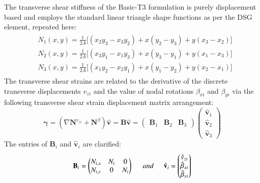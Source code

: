The transverse shear stiffness of the Basic-T3 formulation is purely displacement based and employs the standard linear triangle shape functions as per the DSG element, repeated here:
\begin{gather} 
\begin{aligned}
&N_1 (x , y) = \frac{1}{2 A} \big[ (x_2 y_3 - x_3 y_2) + x(y_2 - y_3) + y(x_3 - x_2) \big]
\\
&N_2 (x , y) = \frac{1}{2 A} \big[ (x_3 y_1 - x_1 y_3) + x(y_3 - y_1) + y(x_1 - x_3) \big]
\\
&N_3 (x , y) = \frac{1}{2 A} \big[ (x_1 y_2 - x_2 y_1) + x(y_1 - y_2) + y(x_2 - x_1) \big]
\label{eqApp2_1}
\end{aligned}
\end{gather}
The transverse shear strains are related to the derivative of the discrete transverse displacements $v_{zi}$ and the value of nodal rotations $\beta_{xi}$ and $\beta_{yi}$ via the following transverse shear strain displacement matrix arrangement:
\begin{equation}
\boldsymbol{\gamma} = (\nabla \mathbf{N}^{v_{zi}} + \mathbf{N}^{\beta} ) \hat{\mathbf{v}} 
= \mathbf{B} \hat{\mathbf{v}}  = 
\begin{pmatrix}
\mathbf{B}_1 & \mathbf{B}_2 & \mathbf{B}_3 
\end{pmatrix}
\begin{pmatrix}
\hat{\mathbf{v}}_1 \\
 \hat{\mathbf{v}}_2 \\
  \hat{\mathbf{v}}_3 
\end{pmatrix}
\label{eqApp2_2}
\end{equation}
The entries of $\mathbf{B}_i$ and $\hat{\mathbf{v}}_i $ are clarified:
\begin{equation}
\mathbf{B}_i=  \begin{pmatrix}
{N}_{i,x} & {N}_i & 0\\
{N}_{i,y} & 0 & {N}_i 
\end{pmatrix}
\hspace{5mm}
and
\hspace{5mm}
\hat{\mathbf{v}}_i =  \begin{pmatrix}
\hat{v}_{zi}\\
\hat{\beta}_{xi}\\
\hat{\beta}_{yi}
\end{pmatrix}
\label{eqApp2_3}
\end{equation}